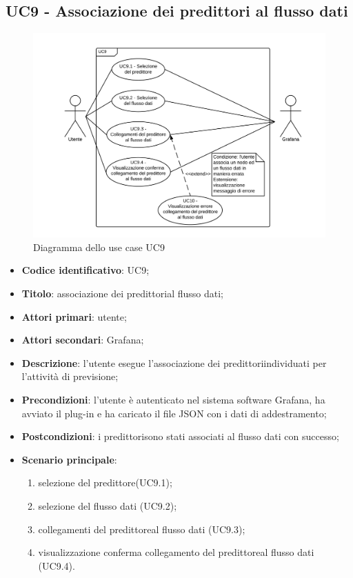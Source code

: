 \subsection{UC9 - Associazione dei predittori al flusso dati}
\begin{figure}[H]
\includegraphics[width=\textwidth,height=\textheight,keepaspectratio]{img/UC9_-_Associazione_dei_predittori_al_flusso_dati.png}
\caption{Diagramma dello use case UC9}
\end{figure}
\begin{itemize}
	\item \textbf{Codice identificativo}: UC9;
	\item \textbf{Titolo}: associazione dei predittori\glosp al flusso dati;
	\item \textbf{Attori primari}: utente;
	\item \textbf{Attori secondari}: Grafana\glo;
	\item \textbf{Descrizione}: l'utente esegue l'associazione dei predittori\glosp individuati per l'attività di previsione;
	\item \textbf{Precondizioni}: l'utente è autenticato nel sistema software Grafana\glo, ha avviato il plug-in e ha caricato il file JSON con i dati di addestramento;
	\item \textbf{Postcondizioni}: i predittori\glosp sono stati associati al flusso dati con successo;
	\item \textbf{Scenario principale}: 
		\begin{enumerate}
			\item selezione del predittore\glosp (UC9.1);
			\item selezione del flusso dati (UC9.2);
			\item collegamenti del predittore\glosp al flusso dati (UC9.3);
			\item visualizzazione conferma collegamento del predittore\glosp al flusso dati (UC9.4).
		\end{enumerate}
\end{itemize}


